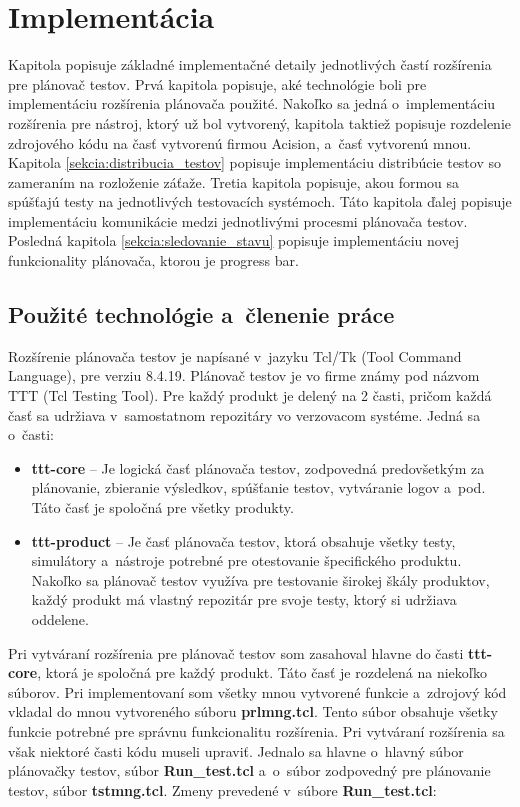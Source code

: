 %
%
\chapter{Implementácia}
\label{kapitola:implementacia}
Kapitola popisuje základné implementačné detaily jednotlivých častí rozšírenia pre plánovač testov.
Prvá kapitola popisuje, aké technológie boli pre implementáciu rozšírenia plánovača použité.
Nakoľko sa jedná o~implementáciu rozšírenia pre nástroj, ktorý už bol vytvorený, kapitola taktiež popisuje 
rozdelenie zdrojového kódu na časť vytvorenú firmou Acision, a~časť vytvorenú mnou.
Kapitola \ref{sekcia:distribucia_testov} popisuje implementáciu distribúcie testov so zameraním na 
rozloženie záťaže. Tretia kapitola popisuje, akou formou sa spúšťajú testy na jednotlivých testovacích
systémoch. Táto kapitola ďalej popisuje implementáciu komunikácie medzi jednotlivými procesmi plánovača testov.
Posledná kapitola \ref{sekcia:sledovanie_stavu} popisuje implementáciu novej funkcionality plánovača, ktorou je progress bar.

\section{Použité technológie a~členenie práce}
\label{sekcia:pouzite_technologie}
Rozšírenie plánovača testov je napísané v~jazyku Tcl/Tk (Tool Command Language), pre verziu 8.4.19.
Plánovač testov je vo firme známy pod názvom TTT (Tcl Testing Tool).
Pre každý produkt je delený na 2 časti, pričom každá časť sa udržiava v~samostatnom repozitáry vo verzovacom systéme.
Jedná sa o~časti: 
\begin{itemize}
\item \textbf{ttt-core} -- Je logická časť plánovača testov, zodpovedná predovšetkým za plánovanie, zbieranie výsledkov,
spúšťanie testov, vytváranie logov a~pod. Táto časť je spoločná pre všetky produkty. 
\item \textbf{ttt-product} -- Je časť plánovača testov, ktorá obsahuje všetky testy, simulátory a~nástroje potrebné pre 
otestovanie špecifického produktu. Nakoľko sa plánovač testov využíva pre testovanie širokej škály produktov, 
každý produkt má vlastný repozitár pre svoje testy, ktorý si udržiava oddelene.
\end{itemize} 

Pri vytváraní rozšírenia pre plánovač testov som zasahoval hlavne do časti \textbf{ttt-core}, ktorá je spoločná pre každý produkt.
Táto časť je rozdelená na niekoľko súborov. Pri implementovaní som všetky mnou vytvorené funkcie a~zdrojový kód vkladal do
mnou vytvoreného súboru \textbf{prlmng.tcl}. Tento súbor obsahuje všetky funkcie potrebné pre správnu funkcionalitu rozšírenia.
Pri vytváraní rozšírenia sa však niektoré časti kódu museli upraviť. Jednalo sa hlavne o~hlavný súbor plánovačky testov, súbor
\textbf{Run\_test.tcl} a~o~súbor zodpovedný pre plánovanie testov, súbor \textbf{tstmng.tcl}. 
Zmeny prevedené v~súbore \textbf{Run\_test.tcl}:


